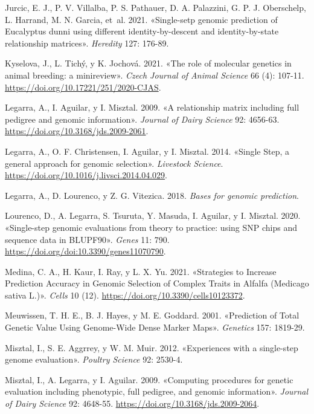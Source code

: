 \documentclass[11pt,spanish,a4paper,oneside,]{book} %
\begin{document}
\leavevmode\hypertarget{ref-cite:11}{}%
Jurcic, E. J., P. V. Villalba, P. S. Pathauer, D. A. Palazzini, G. P. J. Oberschelp, L. Harrand, M. N. Garcia, et~al. 2021. «Single-setp genomic prediction of Eucalyptus dunni using different identity-by-descent and identity-by-state relationship matrices». \emph{Heredity} 127: 176-89.

\leavevmode\hypertarget{ref-cite:32}{}%
Kyselova, J., L. Tichý, y K. Jochová. 2021. «The role of molecular genetics in animal breeding: a minireview». \emph{Czech Journal of Animal Science} 66 (4): 107-11. \url{https://doi.org/10.17221/251/2020-CJAS}.

\leavevmode\hypertarget{ref-cite:17}{}%
Legarra, A., I. Aguilar, y I. Misztal. 2009. «A relationship matrix including full pedigree and genomic information». \emph{Journal of Dairy Science} 92: 4656-63. \url{https://doi.org/10.3168/jds.2009-2061}.

\leavevmode\hypertarget{ref-cite:15}{}%
Legarra, A., O. F. Christensen, I. Aguilar, y I. Misztal. 2014. «Single Step, a general approach for genomic selection». \emph{Livestock Science}. \url{https://doi.org/10.1016/j.livsci.2014.04.029}.

\leavevmode\hypertarget{ref-cite:30}{}%
Legarra, A., D. Lourenco, y Z. G. Vitezica. 2018. \emph{Bases for genomic prediction}.

\leavevmode\hypertarget{ref-cite:22}{}%
Lourenco, D., A. Legarra, S. Tsuruta, Y. Masuda, I. Aguilar, y I. Misztal. 2020. «Single-step genomic evaluations from theory to practice: using SNP chips and sequence data in BLUPF90». \emph{Genes} 11: 790. \url{https://doi.org/doi:10.3390/genes11070790}.

\leavevmode\hypertarget{ref-cite:38}{}%
Medina, C. A., H. Kaur, I. Ray, y L. X. Yu. 2021. «Strategies to Increase Prediction Accuracy in Genomic Selection of Complex Traits in Alfalfa (Medicago sativa L.)». \emph{Cells} 10 (12). \url{https://doi.org/10.3390/cells10123372}.

\leavevmode\hypertarget{ref-cite:8}{}%
Meuwissen, T. H. E., B. J. Hayes, y M. E. Goddard. 2001. «Prediction of Total Genetic Value Using Genome-Wide Dense Marker Maps». \emph{Genetics} 157: 1819-29.

\leavevmode\hypertarget{ref-cite:14}{}%
Misztal, I., S. E. Aggrrey, y W. M. Muir. 2012. «Experiences with a single-step genome evaluation». \emph{Poultry Science} 92: 2530-4.

\leavevmode\hypertarget{ref-cite:16}{}%
Misztal, I., A. Legarra, y I. Aguilar. 2009. «Computing procedures for genetic evaluation including phenotypic, full pedigree, and genomic information». \emph{Journal of Dairy Science} 92: 4648-55. \url{https://doi.org/10.3168/jds.2009-2064}.
\end{document}
